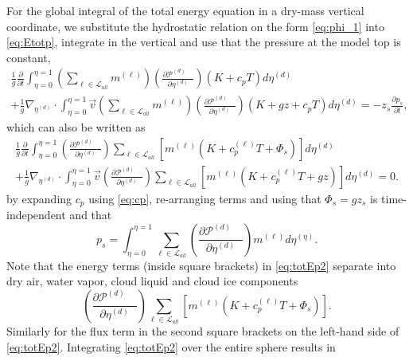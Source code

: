 \documentclass{agujournal}
\begin{document}
For the global integral of the total energy equation in a dry-mass vertical coordinate, we substitute the hydrostatic relation on the form \eqref{eq:phi_1} into \eqref{eq:Etotp}, integrate in the vertical and use that the pressure at the model top is constant,
\begin{multline}
\frac{1}{g}\frac{\partial }{\partial t}\int_{\eta=0}^{\eta=1} \left( \sum_{\ell \in \mathcal{L}_{all}} m^{(\ell)}\right) \left( \frac{\partial \mathcal{P}^{(d)}\quad }{\partial \eta^{(d)}} \right)\left(K+c_pT\right)d \eta^{(d)}\\ +\frac{1}{g}\nabla_{\eta^{(d)}} \cdot \int_{\eta=0}^{\eta=1} \vec{v} \left( \sum_{\ell \in \mathcal{L}_{all}} m^{(\ell)}\right) \left( \frac{\partial \mathcal{P}^{(d)}\quad }{\partial \eta^{(d)}} \right)\left( K+gz+c_pT \right) d \eta^{(d)} =-z_s\frac{\partial p_s}{\partial t},\label{eq:tmp99}
\end{multline}
which can also be written as
\begin{multline}
\frac{1}{g}\frac{\partial }{\partial t}\int_{\eta=0}^{\eta=1} \left( \frac{\partial \mathcal{P}^{(d)}\quad }{\partial \eta^{(d)}} \right)\sum_{\ell \in \mathcal{L}_{all}} \left[m^{(\ell)} \left(K+c_p^{(\ell)}T+\Phi_s  \right)\right]d \eta^{(d)}\\ +\frac{1}{g}\nabla_{\eta^{(d)}} \cdot \int_{\eta=0}^{\eta=1} \vec{v} \left( \frac{\partial \mathcal{P}^{(d)}\quad }{\partial \eta^{(d)}} \right)\sum_{\ell \in \mathcal{L}_{all}} \left[ m^{(\ell)}\left(K+c_p^{(\ell)}T+gz\right) \right]d \eta^{(d)} =0.\label{eq:totEp2}
\end{multline}
by expanding $c_p$ using \eqref{eq:cp}, re-arranging terms and using that $\Phi_s=gz_s$ is time-independent and that 
\begin{equation}
p_s=\int_{\eta=0}^{\eta=1}\sum_{\ell \in \mathcal{L}_{all}}  \left( \frac{\partial \mathcal{P}^{(d)}\quad }{\partial \eta^{(d)}}\right) m^{(\ell)}d\eta^{(\eta)}.
\end{equation}
Note that the energy terms (inside square brackets) in \eqref{eq:totEp2} separate into dry air, water vapor, cloud liquid and cloud ice components
\begin{equation}
\left( \frac{\partial \mathcal{P}^{(d)}\quad }{\partial \eta^{(d)}} \right)\sum_{\ell \in \mathcal{L}_{all}} \left[ m^{(\ell)}\left(K+c_p^{(\ell)}T+\Phi_s\right)\right].
\end{equation}
Similarly for the flux term in the second square brackets on the left-hand side of \eqref{eq:totEp2}. Integrating \eqref{eq:totEp2} over the entire sphere results in
\end{document}
